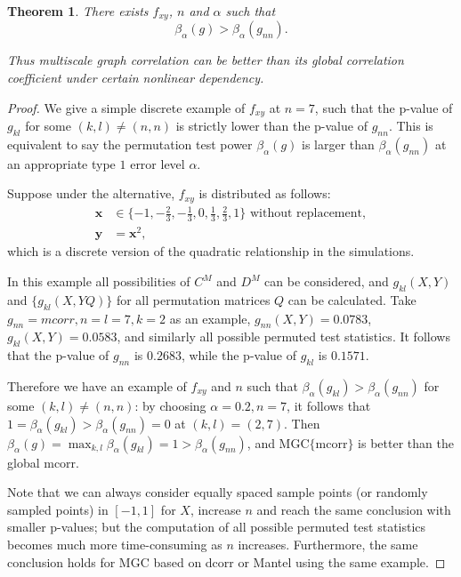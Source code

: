 \documentclass[11pt]{article}
\providecommand{\mb}[1]{\boldsymbol{#1}}
\newtheorem{appThm}{Theorem}
\begin{document}
\begin{appThm}
There exists $f_{xy}$, $n$ and $\alpha$ such that 
\begin{equation}
\beta_{\alpha}(g) > \beta_{\alpha}(g_{nn}).
\end{equation}

Thus multiscale graph correlation can be better than its global correlation coefficient under certain nonlinear dependency.
\end{appThm}
\begin{proof}
We give a simple discrete example of $f_{xy}$ at $n=7$, such that the p-value of $g_{kl}$ for some $(k,l) \neq (n,n)$ is strictly lower than the p-value of $g_{nn}$. This is equivalent to say the permutation test power $\beta_{\alpha}(g)$ is larger than $\beta_{\alpha}(g_{nn})$ at an appropriate type $1$ error level $\alpha$.

Suppose under the alternative, $f_{xy}$ is distributed as follows:
\begin{align*} 
\mb{x} &\in \{-1,-\frac{2}{3},-\frac{1}{3},0,\frac{1}{3},\frac{2}{3},1\} \mbox{ without replacement}, \\
\mb{y} &= \mb{x}^2,
\end{align*}
which is a discrete version of the quadratic relationship in the simulations.

In this example all possibilities of $C^{M}$ and $D^{M}$ can be considered, and $g_{kl}(X, Y)$ and $\{g_{kl}(X, YQ)\}$ for all permutation matrices $Q$ can be calculated. Take $g_{nn}=mcorr, n=l=7, k=2$ as an example, $g_{nn}(X, Y)=0.0783$, $g_{kl}(X, Y)=0.0583$, and similarly all possible permuted test statistics. It follows that the p-value of $g_{nn}$ is $0.2683$, while the p-value of $g_{kl}$ is $0.1571$. 

Therefore we have an example of $f_{xy}$ and $n$ such that $\beta_{\alpha}(g_{kl}) > \beta_{\alpha}(g_{nn})$ for some $(k,l) \neq (n,n)$: by choosing $\alpha=0.2, n=7$, it follows that $1=\beta_{\alpha}(g_{kl}) > \beta_{\alpha}(g_{nn})=0$ at $(k,l)=(2,7)$. Then $\beta_{\alpha}(g)=\max_{k,l}{\beta_{\alpha}(g_{kl})}=1>\beta_{\alpha}(g_{nn})$, and MGC$\{$mcorr$\}$ is better than the global mcorr.

Note that we can always consider equally spaced sample points (or randomly sampled points) in $[-1,1]$ for $X$, increase $n$ and reach the same conclusion with smaller p-values; but the computation of all possible permuted test statistics becomes much more time-consuming as $n$ increases. Furthermore, the same conclusion holds for MGC based on dcorr or Mantel using the same example.
\end{proof}



\end{document}
